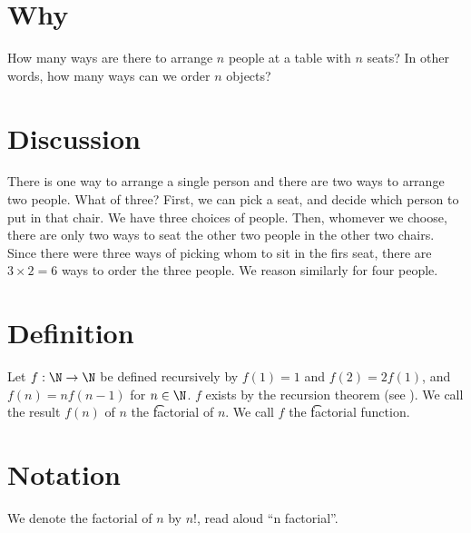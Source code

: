 

\section*{Why}

How many ways are there to arrange $n$ people at a table with $n$ seats?
In other words, how many ways can we order $n$ objects?

\section*{Discussion}

There is one way to arrange a single person and there are two ways to arrange two people.
What of three?
First, we can pick a seat, and decide which person to put in that chair.
We have three choices of people.
Then, whomever we choose, there are only two ways to seat the other two people in the other two chairs.
Since there were three ways of picking whom to sit in the firs seat, there are $3\times 2 = 6$ ways to order the three people.
We reason similarly for four people.

\section*{Definition}

Let $f: \N   \to \N  $ be defined recursively by $f(1) = 1$ and $f(2) = 2f(1)$, and $f(n) = nf(n-1)$ for $n \in \N  $.
$f$ exists by the recursion theorem (see ).
We call the result $f(n)$ of $n$ the \t{factorial} of $n$.
We call $f$ the \t{factorial function}.

\section*{Notation}

We denote the factorial of $n$ by $n!$, read aloud ``n factorial''.

\blankpage